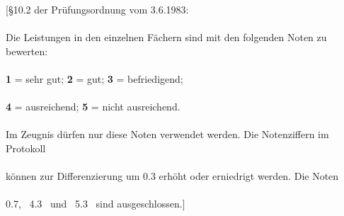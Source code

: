[\S10.2 der Pr\"ufungsordnung vom 3.6.1983: \\\\
Die Leistungen in den einzelnen F\"achern sind mit den folgenden Noten
zu bewerten: \\\\
\hspace*{3cm} {\bf 1} = sehr gut; \hspace*{2cm} {\bf 2} = gut; \hspace*{2cm}
{\bf 3} = befriedigend; \\\\
\hspace*{3cm} {\bf 4} = ausreichend; \hspace*{1.4cm} {\bf 5} =
nicht ausreichend. \\\\
Im Zeugnis d\"urfen nur diese Noten verwendet werden. Die Notenziffern
im Protokoll \\\\
k\"onnen zur Differenzierung um 0.3 erh\"oht oder erniedrigt werden.
Die Noten \\\\
0.7, \ 4.3 \ und \ 5.3 \ sind ausgeschlossen.]
